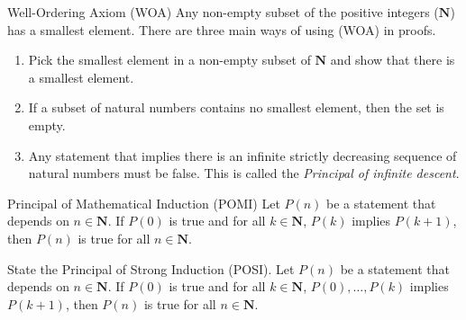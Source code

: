 \begin{Theorem}{Well-Ordering Axiom (WOA)}{}
    Any non-empty subset of the positive integers ($ \mathbf{N} $) has a smallest element.
    \tcblower{}
    There are three main ways of using (WOA) in proofs.
    \begin{enumerate}[(1)]
        \item Pick the smallest element in a non-empty subset of $ \mathbf{N} $ and show that there
              is a smallest element.
        \item If a subset of natural numbers contains no smallest element, then the set
              is empty.
        \item Any statement that implies there is an infinite strictly decreasing sequence
              of natural numbers must be false. This is called the \emph{Principal of infinite
                  descent}.
    \end{enumerate}
\end{Theorem}
\begin{Theorem}{Principal of Mathematical Induction (POMI)}{}
    Let $ P(n) $ be a statement that depends on $ n\in\mathbf{N} $. If $ P(0) $ is true
    and for all $ k\in\mathbf{N} $, $ P(k) $ implies $ P(k+1) $, then $ P(n) $ is true for
    all $ n\in\mathbf{N} $.
\end{Theorem}
\begin{Exercise}{}{}
    State the Principal of Strong Induction (POSI).
    \tcblower{}
    Let $ P(n) $ be a statement that depends on $ n\in\mathbf{N} $. If $ P(0) $ is true
    and for all $ k\in\mathbf{N} $, $ P(0),\ldots,P(k) $ implies $ P(k+1) $, then $ P(n) $ is true for
    all $ n\in\mathbf{N} $.
\end{Exercise}
